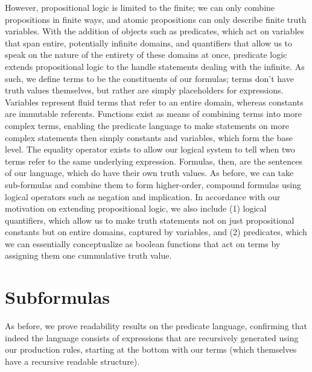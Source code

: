 \documentclass{article}
\begin{document}
However, propositional logic is limited to the finite; we can only combine propositions in finite ways, and atomic propositions can only describe finite truth variables. With the addition of objects such as predicates, which act on variables that span entire, potentially infinite domains, and quantifiers that allow us to speak on the nature of the entirety of these domains at once, predicate logic extends propositional logic to the handle statements dealing with the infinite. As such, we define terms to be the constituents of our formulas; terms don't have truth values themselves, but rather are simply placeholders for expressions. Variables represent fluid terms that refer to an entire domain, whereas constants are immutable referents. Functions exist as means of combining terms into more complex terms, enabling the predicate language to make statements on more complex statements then simply constants and variables, which form the base level. The equality operator exists to allow our logical system to tell when two terms refer to the same underlying expression. Formulas, then, are the sentences of our language, which do have their own truth values. As before, we can take sub-formulas and combine them to form higher-order, compound formulas using logical operators such as negation and implication. In accordance with our motivation on extending propositional logic, we also include (1) logical quantifiers, which allow us to make truth statements not on just propositional constants but on entire domains, captured by variables, and (2) predicates, which we can essentially conceptualize as boolean functions that act on terms by assigning them one cummulative truth value.

\section{Subformulas}
As before, we prove readability results on the predicate language, confirming that indeed the language consists of expressions that are recursively generated using our production rules, starting at the bottom with our terms (which themselves have a recursive readable structure).
\end{document}
